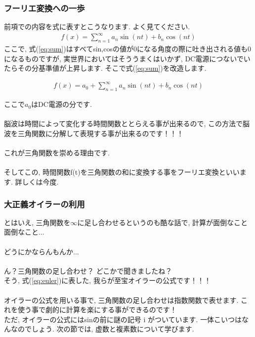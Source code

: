 \documentclass[11pt,a4paper]{jsarticle}
\begin{document}
\subsubsection{フーリエ変換への一歩}
前項での内容を式に表すとこうなります. よく見てください.
\begin{eqnarray}
f(x) = \sum_{n=1}^\infty {a_n \sin(nt) + b_n\cos(nt)}
\label{eq:sum}
\end{eqnarray}
ここで, 式(\ref{eq:sum})はすべてsin,cosの値が0になる角度の際に吐き出される値も0になるものですが, 実世界においてはそううまくはいかず, DC電源につないでいたらその分基準値が上昇します. そこで式(\ref{eq:sum})を改造します.

\begin{eqnarray}
f(x) = a_0 + \sum_{n=1}^\infty {a_n \sin(nt) + b_n\cos(nt)}
\label{eq:fixed_sum}
\end{eqnarray}

ここで$a_0$はDC電源の分です.\\
\\
脳波は時間によって変化する時間関数ととらえる事が出来るので, この方法で脳波を三角関数に分解して表現する事が出来るのです！！！\\
\\
これが三角関数を崇める理由です.\\
\\
そしてこの, 時間関数f(t)を三角関数の和に変換する事をフーリエ変換といいます. 詳しくは今度.\\
\subsubsection{大正義オイラーの利用}
とはいえ, 三角関数を$∞$に足し合わせるというのも酷な話で, 計算が面倒なこと面倒なこと...\\
\\
どうにかならんもんか...\\
\\
ん？三角関数の足し合わせ？ どこかで聞きましたね？\\
そう, 式(\ref{eq:euler})に表した, 我らが至宝オイラーの公式です！！！\\
\\
オイラーの公式を用いる事で, 三角関数の足し合わせは指数関数で表せます. これを使う事で劇的に計算を楽にする事ができるのです！\\
ただ, オイラーの公式にはsinの前に謎の記号 i がついています. 一体こいつはなんなのでしょう. 次の節では, 虚数と複素数について学びます.\\
\end{document}
